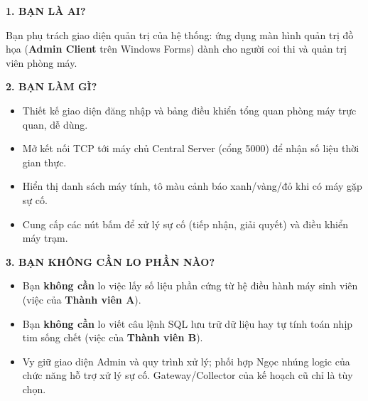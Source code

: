 \documentclass[12pt,a4paper]{article}
\begin{document}
\begin{tcolorbox}[enhanced, colback=lgLightTeal, colframe=lgTeal, boxrule=1pt, arc=2mm, top=2.5mm, bottom=2.5mm, left=3mm, right=3mm]
{\large\bfseries\color{lgTeal} 1. BẠN LÀ AI?}\par
\vspace{1mm}
Bạn phụ trách giao diện quản trị của hệ thống: ứng dụng màn hình quản trị đồ họa (\textbf{Admin Client} trên Windows Forms) dành cho người coi thi và quản trị viên phòng máy.
\end{tcolorbox}
\vspace{2mm}

\begin{tcolorbox}[enhanced, colback=lgLightBlue, colframe=lgDeepBlue, boxrule=1pt, arc=2mm, top=2.5mm, bottom=2.5mm, left=3mm, right=3mm]
{\large\bfseries\color{lgDeepBlue} 2. BẠN LÀM GÌ?}\par
\vspace{1mm}
\begin{itemize}[leftmargin=1.5em, itemsep=1pt, topsep=1pt]
  \item Thiết kế giao diện đăng nhập và bảng điều khiển tổng quan phòng máy trực quan, dễ dùng.
  \item Mở kết nối TCP tới máy chủ Central Server (cổng 5000) để nhận số liệu thời gian thực.
  \item Hiển thị danh sách máy tính, tô màu cảnh báo xanh/vàng/đỏ khi có máy gặp sự cố.
  \item Cung cấp các nút bấm để xử lý sự cố (tiếp nhận, giải quyết) và điều khiển máy trạm.
\end{itemize}
\end{tcolorbox}
\vspace{2mm}

\begin{tcolorbox}[enhanced, colback=lgLightRed, colframe=lgCrimson, boxrule=1pt, arc=2mm, top=2.5mm, bottom=2.5mm, left=3mm, right=3mm]
{\large\bfseries\color{lgCrimson} 3. BẠN KHÔNG CẦN LO PHẦN NÀO?}\par
\vspace{1mm}
\begin{itemize}[leftmargin=1.5em, itemsep=1pt, topsep=1pt]
  \item Bạn \textbf{không cần} lo việc lấy số liệu phần cứng từ hệ điều hành máy sinh viên (việc của \textbf{Thành viên A}).
  \item Bạn \textbf{không cần} lo viết câu lệnh SQL lưu trữ dữ liệu hay tự tính toán nhịp tim sống chết (việc của \textbf{Thành viên B}).
  \item Vy giữ giao diện Admin và quy trình xử lý; phối hợp Ngọc nhúng logic của chức năng hỗ trợ xử lý sự cố. Gateway/Collector của kế hoạch cũ chỉ là tùy chọn.
\end{itemize}
\end{tcolorbox}
\vspace{2mm}
\end{document}
